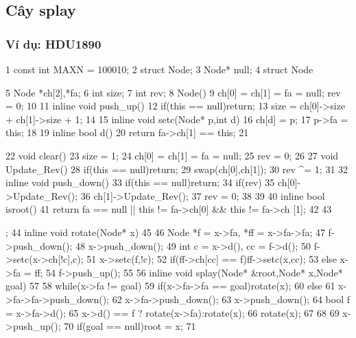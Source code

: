\documentclass[11pt]{article}
\begin{document}
\subsection{Cây splay}

\subsubsection{Ví dụ: HDU1890}

\begin{Code}
 1   const int MAXN = 100010;
 2   struct Node;
 3   Node* null;
 4   struct Node{
 5       Node *ch[2],*fa;
 6       int size;
 7       int rev;
 8       Node(){
 9           ch[0] = ch[1] = fa = null; rev = 0;
10       }
11       inline void push_up(){
12           if(this == null)return;
13           size = ch[0]->size + ch[1]->size + 1;
14       }
15       inline void setc(Node* p,int d){
16           ch[d] = p;
17           p->fa = this;
18       }
19       inline bool d(){
20           return fa->ch[1] == this;
21       }


22       void clear(){
23           size = 1;
24           ch[0] = ch[1] = fa = null;
25           rev = 0;
26       }
27       void Update_Rev(){
28           if(this == null)return;
29           swap(ch[0],ch[1]);
30           rev ^= 1;
31       }
32       inline void push_down(){
33           if(this == null)return;
34           if(rev){
35               ch[0]->Update_Rev();
36               ch[1]->Update_Rev();
37               rev = 0;
38           }
39       }
40       inline bool isroot(){
41           return fa == null || this != fa->ch[0] && this != fa->ch
                [1];
42       }
43   };
44   inline void rotate(Node* x)
45   {
46       Node *f = x->fa, *ff = x->fa->fa;
47       f->push_down();
48       x->push_down();
49       int c = x->d(), cc = f->d();
50       f->setc(x->ch[!c],c);
51       x->setc(f,!c);
52       if(ff->ch[cc] == f)ff->setc(x,cc);
53       else x->fa = ff;
54       f->push_up();
55   }
56   inline void splay(Node* &root,Node* x,Node* goal)
57   {
58       while(x->fa != goal){
59           if(x->fa->fa == goal)rotate(x);
60           else {
61               x->fa->fa->push_down();
62               x->fa->push_down();
63               x->push_down();
64               bool f = x->fa->d();
65               x->d() == f ? rotate(x->fa):rotate(x);
66               rotate(x);
67           }
68       }
69       x->push_up();
70       if(goal == null)root = x;
71   }



\end{Code}
\end{document}
